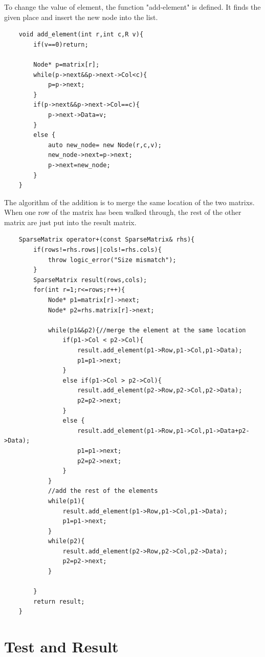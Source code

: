 \documentclass[12pt]{article}
\begin{document}
To change the value of element, the function "{add-element}" is defined. It finds the given place and insert the new node into the list. 
\begin{lstlisting}
    void add_element(int r,int c,R v){
        if(v==0)return;

        Node* p=matrix[r];
        while(p->next&&p->next->Col<c){
            p=p->next;
        }
        if(p->next&&p->next->Col==c){
            p->next->Data=v;
        }
        else {
            auto new_node= new Node(r,c,v);
            new_node->next=p->next;
            p->next=new_node;
        }
    }
\end{lstlisting}

The algorithm of the addition is to merge the same location of the two matrixs. When one row of the matrix has been walked through, the rest of the other 
matrix are just put into the result matrix.
\begin{lstlisting}
    SparseMatrix operator+(const SparseMatrix& rhs){
        if(rows!=rhs.rows||cols!=rhs.cols){
            throw logic_error("Size mismatch");
        }
        SparseMatrix result(rows,cols);
        for(int r=1;r<=rows;r++){
            Node* p1=matrix[r]->next;
            Node* p2=rhs.matrix[r]->next;

            while(p1&&p2){//merge the element at the same location
                if(p1->Col < p2->Col){
                    result.add_element(p1->Row,p1->Col,p1->Data);
                    p1=p1->next;
                }
                else if(p1->Col > p2->Col){
                    result.add_element(p2->Row,p2->Col,p2->Data);
                    p2=p2->next;
                }
                else {
                    result.add_element(p1->Row,p1->Col,p1->Data+p2->Data);
                    p1=p1->next;
                    p2=p2->next;
                }
            }
            //add the rest of the elements
            while(p1){
                result.add_element(p1->Row,p1->Col,p1->Data);
                p1=p1->next;
            }
            while(p2){
                result.add_element(p2->Row,p2->Col,p2->Data);
                p2=p2->next;
            }

        }
        return result;
    }
\end{lstlisting}

\section{Test and Result}
\end{document}
